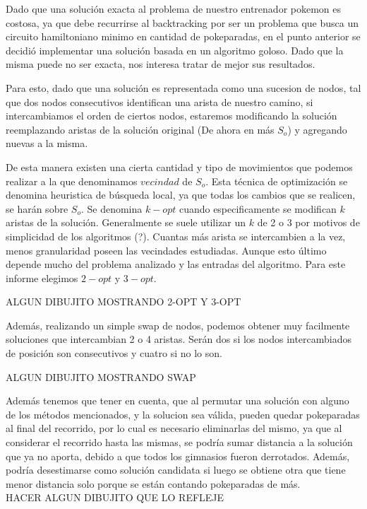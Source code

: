 Dado que una solución exacta al problema de nuestro entrenador pokemon es costosa, ya que debe recurrirse al backtracking por ser un problema que busca un circuito hamiltoniano minimo en cantidad de pokeparadas, en el punto anterior se decidió implementar una solución basada en un algoritmo goloso. Dado que la misma puede no ser exacta, nos interesa tratar de mejor sus resultados. 

Para esto, dado que una solución es representada como una sucesion de nodos, tal que dos nodos consecutivos identifican una arista de nuestro camino, si intercambiamos el orden de ciertos nodos, estaremos modificando la solución reemplazando aristas de la solución original (De ahora en más $S_o$) y agregando nuevas a la misma. 

De esta manera existen una cierta cantidad y tipo de movimientos que podemos realizar a la que denominamos $vecindad$ de $S_o$. Esta técnica de optimización se denomina heuristica de búsqueda local, ya que todas los cambios que se realicen, se harán sobre $S_o$. 
Se denomina $k-opt$ cuando especificamente se modifican $k$ aristas de la solución. Generalmente se suele utilizar un $k$ de 2 o 3 por motivos de simplicidad de los algoritmos (?). Cuantas más arista se intercambien a la vez, menos granularidad poseen las vecindades estudiadas. Aunque esto último depende mucho del problema analizado y las entradas del algoritmo. Para este informe elegimos $2-opt$ y $3-opt$.

ALGUN DIBUJITO MOSTRANDO 2-OPT Y 3-OPT 

Además, realizando un simple swap de nodos, podemos obtener muy facilmente soluciones que intercambian 2 o 4 aristas. Serán dos si los nodos intercambiados de posición son consecutivos y cuatro si no lo son.

ALGUN DIBUJITO MOSTRANDO SWAP

Además tenemos que tener en cuenta, que al permutar una solución con alguno de los métodos mencionados, y la solucion sea válida, pueden quedar pokeparadas al final del recorrido, por lo cual es necesario eliminarlas del mismo, ya que al considerar el recorrido hasta las mismas, se podría sumar distancia a la solución que ya no aporta, debido a que todos los gimnasios fueron derrotados. Además,   podría desestimarse como solución candidata si luego se obtiene otra que tiene menor distancia solo porque se están contando pokeparadas de más.\\

HACER ALGUN DIBUJITO QUE LO REFLEJE
 

